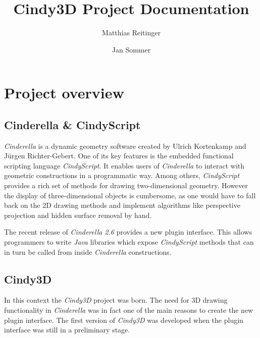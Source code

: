 \documentclass{scrartcl}
\title{Cindy3D Project Documentation}
\author{Matthias Reitinger \and Jan Sommer}
\begin{document}
\maketitle

\newpage

\tableofcontents

\newpage

\section{Project overview}

\subsection{Cinderella \& CindyScript}

\emph{Cinderella} is a dynamic geometry software created by Ulrich Kortenkamp and Jürgen Richter-Gebert. One of its key features is the embedded functional scripting language \emph{CindyScript}. It enables users of \emph{Cinderella} to interact with geometric constructions in a programmatic way. Among others, \emph{CindyScript} provides a rich set of methods for drawing two-dimensional geometry. However the display of three-dimensional objects is cumbersome, as one would have to fall back on the 2D drawing methods and implement algorithms like perspective projection and hidden surface removal by hand.

The recent release of \emph{Cinderella 2.6} provides a new plugin interface. This allows programmers to write \emph{Java} libraries which expose \emph{CindyScript} methods that can in turn be called from inside \emph{Cinderella} constructions.

\subsection{Cindy3D}

In this context the \emph{Cindy3D} project was born. The need for 3D drawing 
functionality in \emph{Cinderella} was in fact one of the main reasons to 
create the new plugin interface. The first version of \emph{Cindy3D} was 
developed when the plugin interface was still in a preliminary stage.
\end{document}
